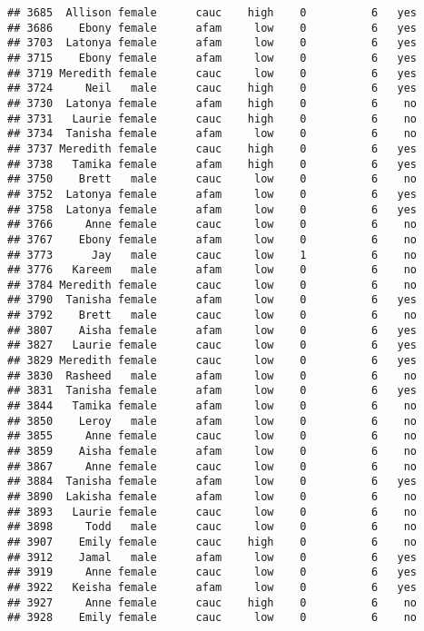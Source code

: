 \documentclass[
]{article}
\begin{document}
\begin{verbatim}
## 3685  Allison female      cauc    high    0          6   yes
## 3686    Ebony female      afam     low    0          6   yes
## 3703  Latonya female      afam     low    0          6   yes
## 3715    Ebony female      afam     low    0          6   yes
## 3719 Meredith female      cauc     low    0          6   yes
## 3724     Neil   male      cauc    high    0          6   yes
## 3730  Latonya female      afam    high    0          6    no
## 3731   Laurie female      cauc    high    0          6    no
## 3734  Tanisha female      afam     low    0          6    no
## 3737 Meredith female      cauc    high    0          6   yes
## 3738   Tamika female      afam    high    0          6   yes
## 3750    Brett   male      cauc     low    0          6    no
## 3752  Latonya female      afam     low    0          6   yes
## 3758  Latonya female      afam     low    0          6   yes
## 3766     Anne female      cauc     low    0          6    no
## 3767    Ebony female      afam     low    0          6    no
## 3773      Jay   male      cauc     low    1          6    no
## 3776   Kareem   male      afam     low    0          6    no
## 3784 Meredith female      cauc     low    0          6    no
## 3790  Tanisha female      afam     low    0          6   yes
## 3792    Brett   male      cauc     low    0          6    no
## 3807    Aisha female      afam     low    0          6   yes
## 3827   Laurie female      cauc     low    0          6   yes
## 3829 Meredith female      cauc     low    0          6   yes
## 3830  Rasheed   male      afam     low    0          6    no
## 3831  Tanisha female      afam     low    0          6   yes
## 3844   Tamika female      afam     low    0          6    no
## 3850    Leroy   male      afam     low    0          6    no
## 3855     Anne female      cauc     low    0          6    no
## 3859    Aisha female      afam     low    0          6    no
## 3867     Anne female      cauc     low    0          6    no
## 3884  Tanisha female      afam     low    0          6   yes
## 3890  Lakisha female      afam     low    0          6    no
## 3893   Laurie female      cauc     low    0          6    no
## 3898     Todd   male      cauc     low    0          6    no
## 3907    Emily female      cauc    high    0          6    no
## 3912    Jamal   male      afam     low    0          6   yes
## 3919     Anne female      cauc     low    0          6   yes
## 3922   Keisha female      afam     low    0          6   yes
## 3927     Anne female      cauc    high    0          6    no
## 3928    Emily female      cauc     low    0          6    no

\end{verbatim}
\end{document}
